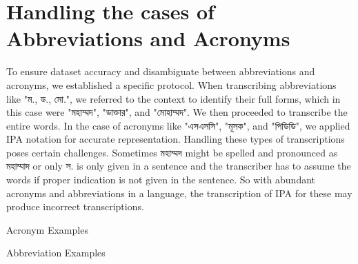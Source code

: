 \section{Handling the cases of Abbreviations and Acronyms}
To ensure dataset accuracy and disambiguate between abbreviations and acronyms, we established a specific protocol. When transcribing abbreviations like \textbengali{"ম., ড., মো."}, we referred to the context to identify their full forms, which in this case were \textbengali{"মহাম্মদ", "ডাক্তার", and "মোহাম্মদ"}. We then proceeded to transcribe the entire words. In the case of acronyms like \textbengali{"এসএসসি", "মূসক", and "পিডিডি"}, we applied IPA notation for accurate representation. Handling these types of transcriptions poses certain challenges. Sometimes \textbengali{মহাম্মদ} might be spelled and pronounced as \textbengali{মহাম্মাদ} or only \textbengali{স.} is only given in a sentence and the transcriber has to assume the words if proper indication is not given in the sentence. So with abundant acronyms and abbreviations in a language, the transcription of IPA for these may produce incorrect transcriptions.

Acronym Examples

\begin{table}[!ht]
    \centering
    \caption{Phonetic Transcription of Acronym}
\end{table}

Abbreviation Examples

\begin{table}[!ht]
    \centering
    \caption{Phonetic Transcription of Abbreviation}
\end{table}

